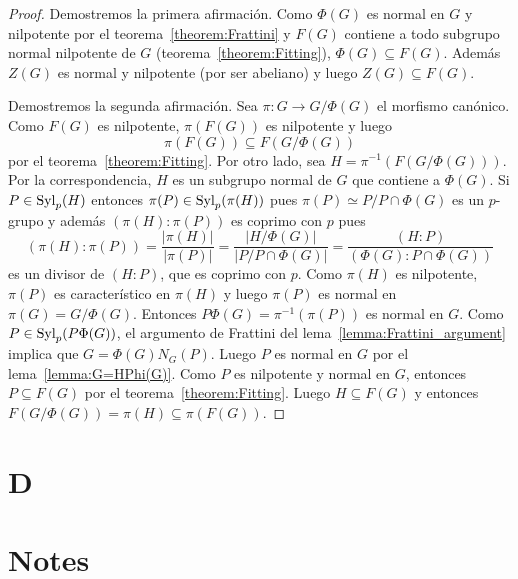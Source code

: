 \begin{proof}
	Demostremos la primera afirmación. Como $\Phi(G)$ es normal en $G$ y
	nilpotente por el teorema~\ref{theorem:Frattini} y $F(G)$ contiene a todo
	subgrupo normal nilpotente de $G$ (teorema~\ref{theorem:Fitting}),
	$\Phi(G)\subseteq F(G)$. Además $Z(G)$ es normal y nilpotente (por ser
	abeliano) y luego $Z(G)\subseteq F(G)$.

	Demostremos la segunda afirmación. Sea $\pi\colon G\to G/\Phi(G)$ el
	morfismo canónico. Como $F(G)$ es nilpotente, $\pi(F(G))$ es nilpotente y
	luego 
	\[
	\pi(F(G))\subseteq F(G/\Phi(G))
	\]
	por el teorema~\ref{theorem:Fitting}. Por otro lado, sea
	$H=\pi^{-1}(F(G/\Phi(G)))$. Por la correspondencia, $H$ es un subgrupo
	normal de $G$ que contiene a $\Phi(G)$. Si $P\in\mathrm{Syl}_p(H)$ entonces
	$\pi(P)\in\mathrm{Syl}_p(\pi(H))$ pues $\pi(P)\simeq P/P\cap \Phi(G)$ es un
	$p$-grupo y además $(\pi(H):\pi(P))$ es coprimo con $p$ pues 
	\[
	(\pi(H):\pi(P))
	=\frac{|\pi(H)|}{|\pi(P)|}
	=\frac{|H/\Phi(G)|}{|P/P\cap \Phi(G)|}
	=\frac{(H:P)}{(\Phi(G):P\cap\Phi(G))}
	\]
	es un divisor de $(H:P)$, que es coprimo con $p$. Como $\pi(H)$ es
	nilpotente, $\pi(P)$ es característico en $\pi(H)$ y luego $\pi(P)$ es
	normal en $\pi(G)=G/\Phi(G)$. Entonces $P\Phi(G)=\pi^{-1}(\pi(P))$ es
	normal en $G$. Como $P\in\mathrm{Syl}_p(P\Phi(G))$, el argumento de Frattini del
	lema~\ref{lemma:Frattini_argument} implica que $G=\Phi(G)N_G(P)$. Luego $P$
	es normal en $G$ por el lema~\ref{lemma:G=HPhi(G)}. Como $P$ es nilpotente
	y normal en $G$, entonces $P\subseteq F(G)$ por el
	teorema~\ref{theorem:Fitting}. Luego $H\subseteq F(G)$ y entonces
	$F(G/\Phi(G))=\pi(H)\subseteq \pi(F(G))$.
\end{proof}

%

\section*{D}


\section*{Notes}
